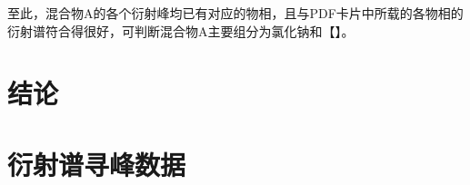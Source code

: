 \documentclass{thuemp}
\begin{document}
至此，混合物A的各个衍射峰均已有对应的物相，且与PDF卡片中所载的各物相的衍射谱符合得很好，可判断混合物A主要组分为氯化钠和【】。

\section{结论}



\renewcommand\refname{\heiti\wuhao\centerline{参考文献}\global\def\refname{参考文献}}
\vskip 12pt


\let\OLDthebibliography\thebibliography
\renewcommand\thebibliography[1]{
  \OLDthebibliography{#1}
  \setlength{\parskip}{0pt}
  \setlength{\itemsep}{0pt plus 0.3ex}
}

{
\renewcommand{\baselinestretch}{0.9}
\liuhao


}

\appendix
\section{衍射谱寻峰数据}
\end{document}
